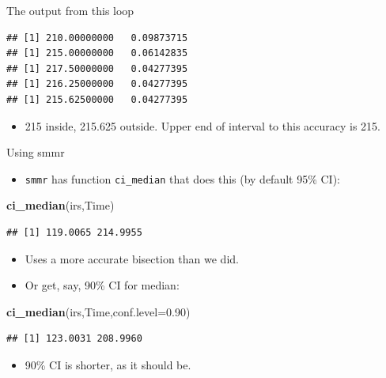 \documentclass[
  ignorenonframetext,
]{beamer}
\newenvironment{Shaded}{\begin{snugshade}}{\end{snugshade}}
\newcommand{\DataTypeTok}[1]{\textcolor[rgb]{0.13,0.29,0.53}{#1}}
\newcommand{\FloatTok}[1]{\textcolor[rgb]{0.00,0.00,0.81}{#1}}
\newcommand{\KeywordTok}[1]{\textcolor[rgb]{0.13,0.29,0.53}{\textbf{#1}}}
\newcommand{\NormalTok}[1]{#1}
\providecommand{\tightlist}{%
  \setlength{\itemsep}{0pt}\setlength{\parskip}{0pt}}
\begin{document}
\begin{frame}[fragile]{The output from this loop}
\protect\hypertarget{the-output-from-this-loop}{}

\begin{verbatim}
## [1] 210.00000000   0.09873715
## [1] 215.00000000   0.06142835
## [1] 217.50000000   0.04277395
## [1] 216.25000000   0.04277395
## [1] 215.62500000   0.04277395
\end{verbatim}

\begin{itemize}
\tightlist
\item
  215 inside, 215.625 outside. Upper end of interval to this accuracy is
  215.
\end{itemize}

\end{frame}

\begin{frame}[fragile]{Using smmr}
\protect\hypertarget{using-smmr}{}

\begin{itemize}
\tightlist
\item
  \texttt{smmr} has function \texttt{ci\_median} that does this (by
  default 95\% CI):
\end{itemize}

\begin{Shaded}
\begin{Highlighting}[]
\KeywordTok{ci_median}\NormalTok{(irs,Time)}
\end{Highlighting}
\end{Shaded}

\begin{verbatim}
## [1] 119.0065 214.9955
\end{verbatim}

\begin{itemize}
\tightlist
\item
  Uses a more accurate bisection than we did.
\item
  Or get, say, 90\% CI for median:
\end{itemize}

\begin{Shaded}
\begin{Highlighting}[]
\KeywordTok{ci_median}\NormalTok{(irs,Time,}\DataTypeTok{conf.level=}\FloatTok{0.90}\NormalTok{)}
\end{Highlighting}
\end{Shaded}

\begin{verbatim}
## [1] 123.0031 208.9960
\end{verbatim}

\begin{itemize}
\tightlist
\item
  90\% CI is shorter, as it should be.
\end{itemize}

\end{frame}
\end{document}
